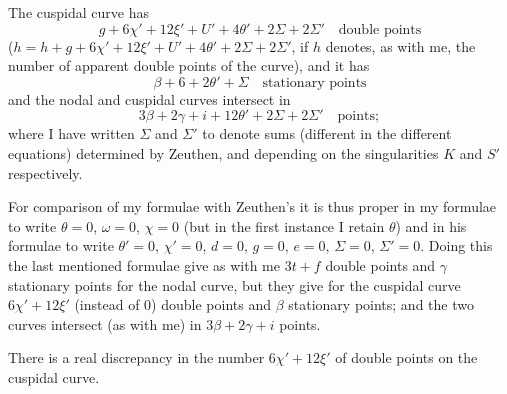 \documentclass[11pt,a4paper]{article}
\theoremstyle{plain}
\theoremstyle{definition}
\theoremstyle{remark}
\begin{document}
The cuspidal curve has
\[
g+6\chi'+12\xi'+U'+4\theta'+2\Sigma+2\Sigma'\quad\text{double points}
\]
($h=h+g+6\chi'+12\xi'+U'+4\theta'+2\Sigma+2\Sigma'$, if $h$ denotes, as with me, the number of apparent double points of the curve), and it has
\[
\beta+6+2\theta'+\Sigma\quad\text{stationary points}
\]
and the nodal and cuspidal curves intersect in
\[
3\beta+2\gamma+i+12\theta'+2\Sigma+2\Sigma'\quad\text{points};
\]
where I have written $\Sigma$ and $\Sigma'$ to denote sums (different in the different equations) determined by Zeuthen, and depending on the singularities $K$ and $S'$ respectively.

For comparison of my formulae with Zeuthen's it is thus proper in my formulae to write $\theta=0$, $\omega=0$, $\chi=0$ (but in the first instance I retain $\theta$) and in his formulae to write $\theta'=0$, $\chi'=0$, $d=0$, $g=0$, $e=0$, $\Sigma=0$, $\Sigma'=0$. Doing this the last mentioned formulae give as with me $3t+f$ double points and $\gamma$ stationary points for the nodal curve, but they give for the cuspidal curve $6\chi'+12\xi'$ (instead of $0$) double points and $\beta$ stationary points; and the two curves intersect (as with me) in $3\beta+2\gamma+i$ points.

There is a real discrepancy in the number $6\chi'+12\xi'$ of double points on the cuspidal curve.

\newpage
\setcounter{page}{626}
\end{document}
